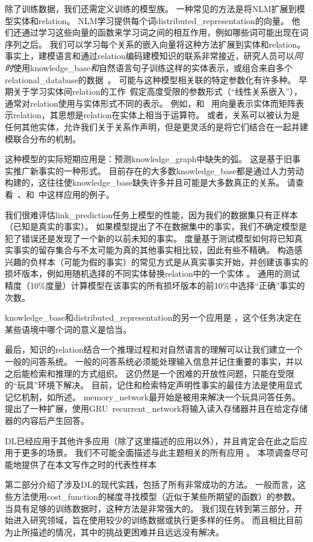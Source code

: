 除了训练数据，我们还需定义训练的模型族。
一种常见的方法是将\gls{NLM}扩展到模型实体和\gls{relation}。
\gls{NLM}学习提供每个词\gls{distributed_representation}的向量。
他们还通过学习这些向量的函数来学习词之间的相互作用，例如哪些词可能出现在词序列之后。
我们可以学习每个关系的嵌入向量将这种方法扩展到实体和\gls{relation}。
事实上，建模语言和通过\gls{relation}编码建模知识的联系非常接近，研究人员可以\emph{同时}使用\gls{knowledge_base}\emph{和}自然语言句子训练这样的实体表示\citep{bordes-aaai-2011,Bordes-et-al-AISTATS2012-small,Wang-et-al-EMNLP2014}，或组合来自多个\gls{relational_database}的数据~\citep{Bordes-et-al-NIPS2013}。
可能与这种模型相关联的特定参数化有许多种。
早期关于学习实体间\gls{relation}的工作~\citep{Paccanaro2000}假定高度受限的参数形式（``线性关系嵌入''），通常对\gls{relation}使用与实体形式不同的表示。
例如，\citet{Paccanaro2000}和~\citet{bordes-aaai-2011} 用向量表示实体而矩阵表示\gls{relation}，其思想是\gls{relation}在实体上相当于运算符。
或者，关系可以被认为是任何其他实体\citep{Bordes-et-al-AISTATS2012-small}，允许我们关于关系作声明，但是更灵活的是将它们结合在一起并建模联合分布的机制。

这种模型的实际短期应用是：预测\gls{knowledge_graph}中缺失的弧。
这是基于旧事实推广新事实的一种形式。
目前存在的大多数\gls{knowledge_base}都是通过人力劳动构建的，这往往使\gls{knowledge_base}缺失许多并且可能是大多数真正的关系。
请查看~\citet{Wang-et-al-AAAI2014}、\citet{Lin-et-al-AAAI2015}和~\citet{Garcia-Duran-et-al-arxiv2015}中这样应用的例子。

我们很难评估\gls{link_prediction}任务上模型的性能，因为我们的数据集只有正样本（已知是真实的事实）。
如果模型提出了不在数据集中的事实，我们不确定模型是犯了错误还是发现了一个新的以前未知的事实。
度量基于测试模型如何将已知真实事实的留存集合与不太可能为真的其他事实相比较，因此有些不精确。
构造感兴趣的负样本（可能为假的事实）的常见方式是从真实事实开始，并创建该事实的损坏版本，例如用随机选择的不同实体替换\gls{relation}中的一个实体 。
通用的测试精度（10$\%$度量）计算模型在该事实的所有损坏版本的前10$\%$中选择``正确''事实的次数。

\gls{knowledge_base}和\gls{distributed_representation}的另一个应用是 \citep{Navigli+Verlardi-2005,Bordes-et-al-AISTATS2012-small}，这个任务决定在某些语境中哪个词的意义是恰当。

最后，知识的\gls{relation}结合一个推理过程和对自然语言的理解可以让我们建立一个一般的问答系统。
一般的问答系统必须能处理输入信息并记住重要的事实，并以之后能检索和推理的方式组织。
这仍然是一个困难的开放性问题，只能在受限的``玩具''环境下解决。
目前，记住和检索特定声明性事实的最佳方法是使用显式记忆机制，如所述。
\gls{memory_network}最开始是被用来解决一个玩具问答任务\citep{Weston2014}。
\citet{Kumar-et-al-arxiv2015} 提出了一种扩展，使用GRU~\gls{recurrent_network}将输入读入存储器并且在给定存储器的内容后产生回答。

\gls{DL}已经应用于其他许多应用（除了这里描述的应用以外），并且肯定会在此之后应用于更多的场景。
我们不可能全面描述与此主题相关的所有应用 。
本项调查尽可能地提供了在本文写作之时的代表性样本

第二部分介绍了涉及\gls{DL}的现代实践，包括了所有非常成功的方法。
一般而言，这些方法使用\gls{cost_function}的梯度寻找模型（近似于某些所期望的函数）的参数。
当具有足够的训练数据时，这种方法是非常强大的。
我们现在转到第三部分，开始进入研究领域，旨在使用较少的训练数据或执行更多样的任务。
而且相比目前为止所描述的情况，其中的挑战更困难并且远远没有解决。
